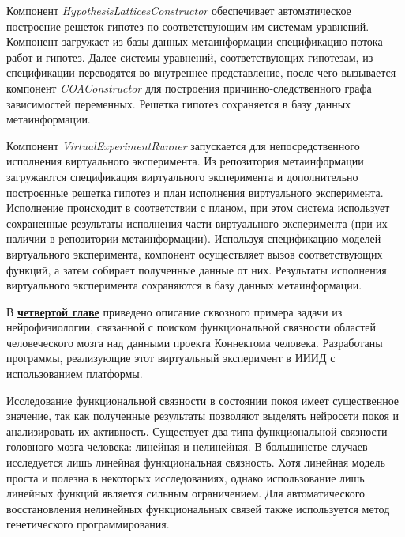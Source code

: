 Компонент \textit{HypothesisLatticesConstructor} обеспечивает автоматическое построение решеток гипотез по соответствующим 
им системам уравнений. Компонент загружает из базы данных метаинформации спецификацию потока работ и гипотез. 
Далее системы уравнений, соответствующих гипотезам, из спецификации переводятся во внутреннее представление, 
после чего вызывается компонент \textit{COAConstructor} для построения причинно-следственного графа зависимостей переменных. 
Решетка гипотез сохраняется в базу данных метаинформации.

Компонент \textit{VirtualExperimentRunner} запускается для непосредственного исполнения виртуального эксперимента. 
Из репозитория метаинформации загружаются спецификация виртуального эксперимента и дополнительно построенные 
решетка гипотез и план исполнения виртуального эксперимента. Исполнение происходит в соответствии с планом, при 
этом система использует сохраненные результаты исполнения части виртуального эксперимента (при их наличии в 
репозитории метаинформации). Используя спецификацию моделей виртуального эксперимента, компонент осуществляет 
вызов соответствующих функций, а затем собирает полученные данные от них. Результаты исполнения виртуального 
эксперимента сохраняются в базу данных метаинформации.



В \underline{\textbf{четвертой главе}} приведено описание сквозного примера задачи из нейрофизиологии,
связанной с поиском функциональной связности областей человеческого мозга над данными проекта Коннектома человека.
Разработаны программы, реализующие этот виртуальный эксперимент в ИИИД с использованием платформы.

Исследование функциональной связности в состоянии покоя имеет существенное значение, так как полученные результаты 
позволяют выделять нейросети покоя и анализировать их активность. Существует два типа функциональной связности 
головного мозга человека: линейная и нелинейная. В большинстве 
случаев исследуется лишь линейная функциональная связность. Хотя линейная модель проста и полезна в некоторых 
исследованиях, однако использование лишь линейных функций является сильным ограничением. Для автоматического 
восстановления нелинейных функциональных связей также используется метод генетического 
программирования. 

